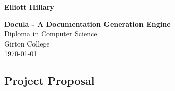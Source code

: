 \documentclass[twoside,10pt,notitlepage]{Classes/CUEDthesisPSnPDF}
\begin{document}
\pagestyle{empty}

\hfill{\LARGE \bf Elliott Hillary}

\vspace*{60mm}
\begin{center}
\Huge
{\bf Docula - A Documentation Generation Engine} \\
\vspace*{5mm}
Diploma in Computer Science \\
\vspace*{5mm}
Girton College \\
\vspace*{5mm}
\today  %
\end{center}

\cleardoublepage

\setcounter{secnumdepth}{3}
\setcounter{tocdepth}{3}

\frontmatter %
\newpage

\cleardoublepage


\tableofcontents

\mainmatter %
\pagestyle{fancy}






\begin{appendices}
\chapter{Project Proposal}

\end{appendices}
\end{document}
